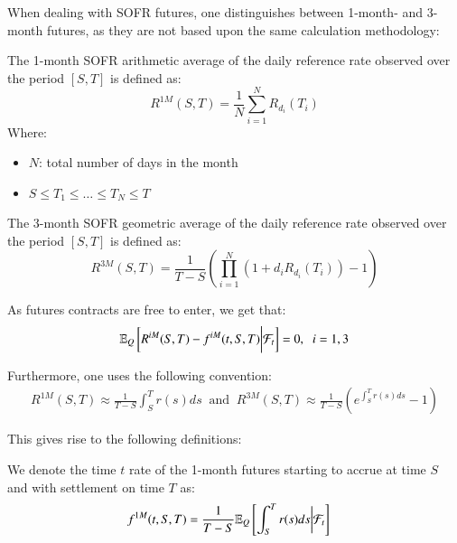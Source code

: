 \newpage 

When dealing with SOFR futures, one distinguishes between 1-month- and 3-month futures, as they are not based upon the same calculation methodology:

\begin{definition}
The 1-month 
SOFR arithmetic average of the daily reference rate observed over the period $[S,T]$ is defined as: 
\[
R^{1M}(S,T) = \frac{1}{N}\sum_{i=1}^{N}R_{d_{i}}(T_{i})
\]
Where:
\begin{itemize}[leftmargin=*]
    \item $N$: total number of days in the month
    \item $S\leq T_{1} \leq \dots \leq T_{N} \leq T$ 
\end{itemize}
\end{definition}

\begin{definition}
The 3-month 
SOFR geometric average of the daily reference rate observed over the period $[S,T]$ is defined as: 
\[
R^{3M}(S,T) = \frac{1}{T-S}\left(
\prod_{i=1}^{N}(1+d_{i}R_{d_{i}}(T_{i})) - 1
\right)
\]
\end{definition}


As futures contracts are free to enter, we get that: 
\begin{align*}
\mathbb{E}_{Q}\left[
R^{iM}(S,T) - f^{iM}(t,S,T)\bigg{|}\mathcal{F}_{t}
\right] = 0, \;\; i = 1,3   
\end{align*}

Furthermore, one uses the following convention: 
\begin{align*}
R^{1M}(S,T) \approx  \frac{1}{T-S}\int_{S}^{T}r(s)ds 
\;\;\text{and}\;\;
R^{3M}(S,T) \approx  \frac{1}{T-S}\left(e^{\int_{S}^{T}r(s)ds} -1\right) 
\end{align*}

This gives rise to the following definitions:

\begin{definition}
\label{def: 1M_SOFR_futures}
We denote the time $t$ rate of the 1-month futures starting to accrue at time $S$ and with settlement on time $T$ as:
\begin{align*}
f^{1M}(t,S,T) &= \frac{1}{T-S}\mathbb{E}_{Q}\left[
\int_{S}^{T}r(s)ds\bigg{|}\mathcal{F}_{t}
\right]    
\end{align*}
\end{definition} 

